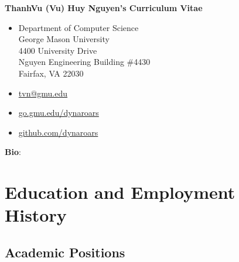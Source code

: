 \documentclass[11pt]{article}
\makeatletter
\newcommand{\updateinfo}[1][\today]{\par\vfill\hfill{\faPencil{} \scriptsize \color{darkgray}Last updated on #1}}
\newcommand{\myname}{ThanhVu (Vu) Huy Nguyen}
\newcommand{\myemailwork}{\href{mailto:tvn@gmu.edu}{tvn@gmu.edu}}
\newcommand{\mylab}{\href{https://go.gmu.edu/dynaroars}{go.gmu.edu/dynaroars}}
\newcommand{\mysoftware}{\href{https://github.com/dynaroars}{github.com/dynaroars}}
\makeatother
\begin{document}
\thispagestyle{empty}

\begin{center}
    \textbf{\LARGE \myname{}'s Curriculum Vitae}
\end{center}

\vspace{0.1in}
\begin{minipage}{.40\textwidth}
    \footnotesize
    \begin{itemize}[label={}]
        \item Department of Computer Science\\
        George Mason University\\
        4400 University Drive\\
        Nguyen Engineering Building \#4430\\
        Fairfax, VA 22030
    \end{itemize}
\end{minipage}
\hfill
\begin{minipage}{.40\textwidth}
    \footnotesize
    \begin{itemize}[label={}]
        \item \faEnvelope{} \myemailwork{}
        \item \faHome{} \mylab{}
        \item \faGithub{} \mysoftware{}
    \end{itemize}
\end{minipage}




\vspace{0.2in}
\begin{tcolorbox}[colback=gray!5!white,colframe=gray,center,boxrule=0.2pt,width=0.98\textwidth]
    \small \textbf{Bio}: 
\end{tcolorbox}

\section{Education and Employment History}




\subsection{Academic Positions}
\end{document}
